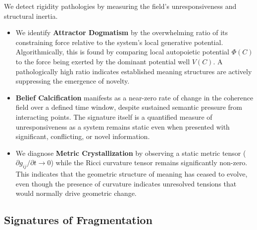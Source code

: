 We detect rigidity pathologies by measuring the field's unresponsiveness and structural inertia.
\begin{itemize}
    \item We identify \textbf{Attractor Dogmatism} by the overwhelming ratio of its constraining force relative to the system's local generative potential. Algorithmically, this is found by comparing local autopoietic potential \(\Phi(C)\) to the force being exerted by the dominant potential well \(V(C)\). A pathologically high ratio indicates established meaning structures are actively suppressing the emergence of novelty.
    \item \textbf{Belief Calcification} manifests as a near-zero rate of change in the coherence field over a defined time window, despite sustained semantic pressure from interacting points. The signature itself is a quantified measure of unresponsiveness as a system remains static even when presented with significant, conflicting, or novel information.
    \item We diagnose \textbf{Metric Crystallization} by observing a static metric tensor (\(\partial g_{ij} / \partial t \to 0\)) while the Ricci curvature tensor remains significantly non-zero. This indicates that the geometric structure of meaning has ceased to evolve, even though the presence of curvature indicates unresolved tensions that would normally drive geometric change.
\end{itemize}


\subsection{Signatures of Fragmentation}
\label{sec:signatures_of_fragmentation}

